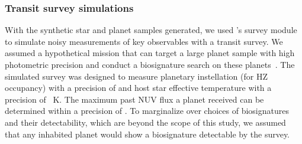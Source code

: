 \documentclass[twocolumn,twocolappendix,linenumbers]{aastex631}
\begin{document}
\subsubsection{Transit survey simulations}
With the synthetic star and planet samples generated, we used \bioverse's survey module to simulate noisy measurements of key observables with a transit survey.
We assumed a hypothetical mission that can target a large planet sample with high photometric precision and conduct a biosignature search on these planets~\citep[e.g.,][]{Apai2019,Apai2022}.
The simulated survey was designed to measure planetary instellation (for \gls{HZ} occupancy) with a precision of  and host star effective temperature with a precision of ~K.
The maximum past \gls{NUV} flux a planet received can be determined within a precision of .
To marginalize over choices of biosignatures and their detectability, which are beyond the scope of this study, we assumed that any inhabited planet would show a biosignature detectable by the survey.

\end{document}
